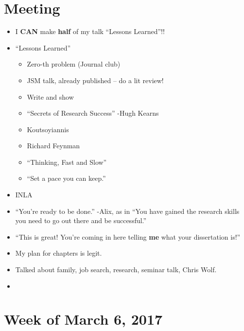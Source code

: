 \documentclass{article}
\begin{document}
\section*{Meeting}
\begin{itemize}
\item I {\bf CAN} make {\bf half} of my talk ``Lessons Learned''!!
\item ``Lessons Learned'' 
  \begin{itemize}
  \item Zero-th problem (Journal club)
  \item JSM talk, already published -- do a lit review!
  \item Write and show
  \item ``Secrets of Research Success'' -Hugh Kearns
  \item Koutsoyiannis
  \item Richard Feynman
  \item ``Thinking, Fast and Slow''
  \item ``Set a pace you can keep.''
  \end{itemize}
\item INLA
\item ``You're ready to be done.'' -Alix, as in ``You have gained the research skills you need to go out there and be successful.''
\item ``This is great! You're coming in here telling {\bf  me} what your dissertation is!''
\item My plan for chapters is legit.
\item Talked about family, job search, research, seminar talk, Chris Wolf.
\item
\end{itemize}

\section*{Week of March 6, 2017}
\end{document}
